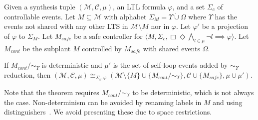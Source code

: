 


\begin{theorem} 
\label{PS+SOE_control}
    Given a synthesis tuple $(\mathcal{M}, \mathcal{C}, \mu)$, an LTL formula $\varphi$, and a set $\Sigma_c$ of controllable events.
    Let $M \subseteq \mathcal{M}$ with alphabet $\Sigma_{M} = \Upsilon \dot{\cup} \Omega$ where $\Upsilon$ has the events not shared with any other LTS in $\mathcal{M}\setminus M$ nor in $\varphi$. Let $\varphi'$ be a projection of $\varphi$ to $\Sigma_{M}$. 
    Let $M_{safe}$ be a safe controller for $\langle M, \Sigma_c, \Box\Diamond\bigwedge_{l\in \mu}\neg l \implies \varphi \rangle$.  
    Let $M_{cont}$ be the subplant $M$ controlled by $M_{safe}$ with shared events $\Omega$.

    If $M_{cont} \slash \! \sim_\Upsilon$ is deterministic and $\mu'$ is the set of self-loop events added by $\sim_\Upsilon$ reduction, then  $(\mathcal{M}, \mathcal{C}, \mu) \cong_{\Sigma_c, \varphi} (\mathcal{M} \setminus \{M\} \cup \{M_{cont} \slash \! \sim_\Upsilon\}, \mathcal{C} \cup \{ M_{safe} \}, \mu \cup \mu')$. 
\end{theorem}

Note that the theorem requires  $M_{cont} \slash \! \sim_\Upsilon$ to be deterministic, which is not always the case. Non-determinism can be avoided by renaming labels in $M$ and using distinguishers~\cite{mohajerani_algorithm_2012}. We avoid presenting these due to space restrictions. 


%
